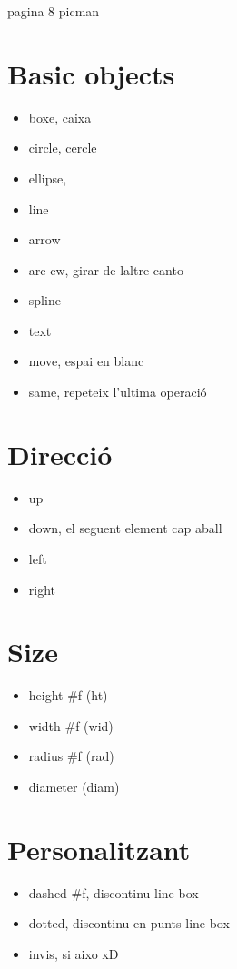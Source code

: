 pagina 8 picman

\section{Basic objects}
\begin{itemize}
\item boxe, caixa
\item circle, cercle
\item ellipse, 
\item line
	\subitem <->
\item arrow
\item arc
	\subitem cw, girar de laltre canto
\item spline
\item text
\item move, espai en blanc
\item same, repeteix l'ultima operació
\end{itemize}

\section{Direcció}
\begin{itemize}
\item up
\item down, el seguent element cap aball
\item left
\item right
\end{itemize}

\section{Size}
\begin{itemize}
\item height #f (ht)
\item width #f (wid)
\item radius #f (rad)
\item diameter (diam)
\end{itemize}

\section{Personalitzant}
\begin{itemize}
\item dashed #f, discontinu
	\subitem line
	\subitem box
\item dotted, discontinu en punts
	\subitem line
	\subitem box
\item invis, si aixo xD
\end{itemize}

